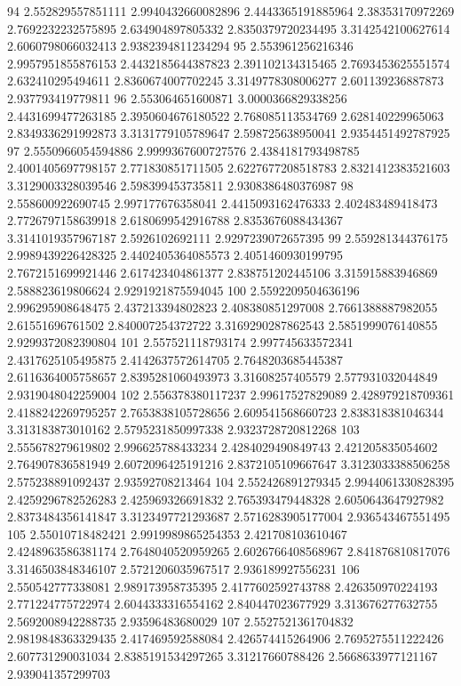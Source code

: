 94 2.552829557851111 2.9940432660082896 2.4443365191885964 2.38353170972269 2.7692232232575895 2.634904897805332 2.8350379720234495 3.3142542100627614 2.6060798066032413 2.9382394811234294
95 2.553961256216346 2.9957951855876153 2.4432185644387823 2.391102134315465 2.7693453625551574 2.632410295494611 2.8360674007702245 3.3149778308006277 2.601139236887873 2.937793419779811
96 2.553064651600871 3.0000366829338256 2.4431699477263185 2.3950604676180522 2.768085113534769 2.628140229965063 2.8349336291992873 3.3131779105789647 2.598725638950041 2.9354451492787925
97 2.5550966054594886 2.9999367600727576 2.4384181793498785 2.4001405697798157 2.771830851711505 2.6227677208518783 2.8321412383521603 3.3129003328039546 2.598399453735811 2.9308386480376987
98 2.558600922690745 2.997177676358041 2.4415093162476333 2.402483489418473 2.7726797158639918 2.6180699542916788 2.8353676088434367 3.3141019357967187 2.5926102692111 2.9297239072657395
99 2.559281344376175 2.9989439226428325 2.4402405364085573 2.4051460930199795 2.7672151699921446 2.617423404861377 2.838751202445106 3.315915883946869 2.588823619806624 2.9291921875594045
100 2.5592209504636196 2.996295908648475 2.437213394802823 2.408380851297008 2.7661388887982055 2.61551696761502 2.840007254372722 3.3169290287862543 2.5851999076140855 2.9299372082390804
101 2.557521118793174 2.997745633572341 2.4317625105495875 2.4142637572614705 2.7648203685445387 2.6116364005758657 2.8395281060493973 3.31608257405579 2.577931032044849 2.9319048042259004
102 2.556378380117237 2.99617527829089 2.428979218709361 2.4188242269795257 2.7653838105728656 2.609541568660723 2.838318381046344 3.313183873010162 2.5795231850997338 2.9323728720812268
103 2.555678279619802 2.996625788433234 2.4284029490849743 2.421205835054602 2.764907836581949 2.6072096425191216 2.8372105109667647 3.3123033388506258 2.575238891092437 2.93592708213464
104 2.552426891279345 2.9944061330828395 2.4259296782526283 2.425969326691832 2.765393479448328 2.6050643647927982 2.8373484356141847 3.3123497721293687 2.5716283905177004 2.936543467551495
105 2.55010718482421 2.9919989865254353 2.421708103610467 2.4248963586381174 2.7648040520959265 2.6026766408568967 2.841876810817076 3.3146503848346107 2.5721206035967517 2.936189927556231
106 2.550542777338081 2.989173958735395 2.4177602592743788 2.426350970224193 2.771224775722974 2.6044333316554162 2.840447023677929 3.313676277632755 2.5692008942288735 2.93596483680029
107 2.5527521361704832 2.9819848363329435 2.417469592588084 2.426574415264906 2.7695275511222426 2.607731290031034 2.8385191534297265 3.31217660788426 2.5668633977121167 2.939041357299703
